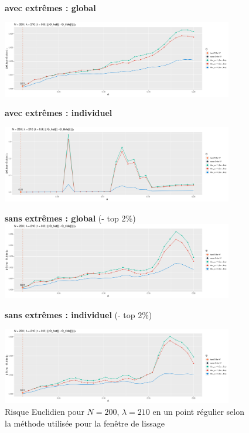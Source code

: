\begin{figure}[H]
	\centering

	\textbf{avec extrêmes : global}

\includegraphics[width=0.9\textwidth]{Images/indiv_glob_img/compare/210_regular/all_glob.jpg}

	\textbf{avec extrêmes : individuel}

\includegraphics[width=0.9\textwidth]{Images/indiv_glob_img/compare/210_regular/all.jpg}

\textbf{sans extrêmes : global} (- top 2\%)
\includegraphics[width=0.9\textwidth]{Images/indiv_glob_img/compare/210_regular/no_xtrm_glob.jpg}

	\textbf{sans extrêmes : individuel} (- top 2\%)

\includegraphics[width=0.9\textwidth]{Images/indiv_glob_img/compare/210_regular/no_xtrm.jpg}


	\caption{Risque Euclidien pour $N=200$, $\lambda=210$ en un point régulier selon la méthode utilisée pour la fenêtre de lissage}
	\label{fig:compare_xtrm_2}
\end{figure}

